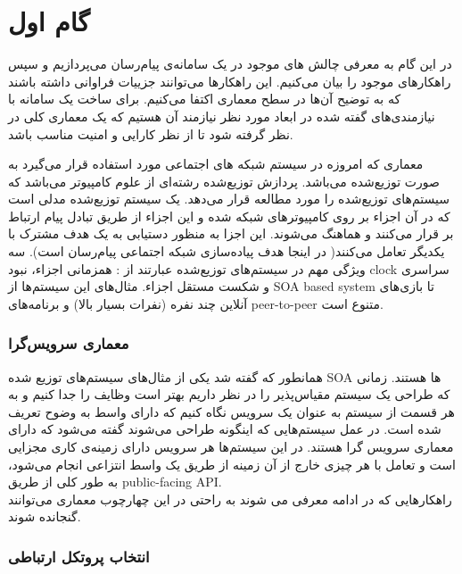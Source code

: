 \chapter{گام اول}\label{chap:1}

در این گام به معرفی چالش های موجود در یک سامانه‌ی پیام‌رسان می‌پردازیم و سپس راهکارهای موجود را بیان می‌کنیم. این راهکار‌ها می‌توانند جزییات فراوانی داشته باشند که به توضیح آن‌ها در سطح معماری اکتفا می‌کنیم.
برای ساخت یک سامانه با نیازمندی‌های گفته شده در ابعاد مورد نظر نیازمند آن هستیم که یک معماری کلی در نظر گرفته شود تا از نظر کارایی و امنیت مناسب باشد.

معماری‌ که امروزه در سیستم‌ شبکه های اجتماعی مورد استفاده قرار می‌گیرد به صورت توزیع‌شده  می‌باشد. پردازش توزیع‌شده رشته‌ای از علوم کامپیوتر می‌باشد که سیستم‌های توزیع‌شده را مورد مطالعه قرار می‌دهد. یک سیستم توزیع‌شده مدلی است که در آن اجزاء بر روی کامپیوتر‌های شبکه شده و این اجزاء از طریق تبادل پیام ارتباط بر قرار می‌کنند و هماهنگ می‌شوند. این اجزا به منظور دستیابی به یک هدف مشترک با یکدیگر تعامل می‌کنند( در اینجا هدف پیاده‌سازی شبکه اجتماعی پیام‌رسان است).  سه ویژگی مهم در سیستم‌های توزیع‌شده عبارتند از : همزمانی اجزاء، نبود clock سراسری و شکست مستقل اجزاء. مثال‌های این سیستم‌ها از SOA based system   تا بازی‌های آنلاین چند نفره (نفرات بسیار بالا) و برنامه‌های peer-to-peer متنوع است. 

\subsection{معماری سرویس‌گرا \label{sec:soa}}
همانطور که گفته شد یکی از مثال‌های سیستم‌های توزیع شده SOA ‌ها هستند. زمانی که طراحی یک سیستم مقیاس‌پذیر را در نظر داریم بهتر است وظایف را جدا کنیم و به هر قسمت از سیستم به عنوان یک سرویس نگاه کنیم که دارای واسط به وضوح تعریف شده است. در عمل سیستم‌هایی که اینگونه طراحی می‌شوند گفته می‌شود که دارای معماری سرویس گرا  هستند. در این سیستم‌ها هر سرویس دارای زمینه‌ی کاری مجزایی است و تعامل با هر چیزی خارج از آن زمینه از طریق یک واسط انتزاعی انجام می‌شود، به طور کلی از طریق public-facing API.   \\
راهکارهایی که در ادامه معرفی می شوند به راحتی در این چهارچوب معماری می‌توانند گنجانده شوند.

\subsection{انتخاب پروتکل ارتباطی}


